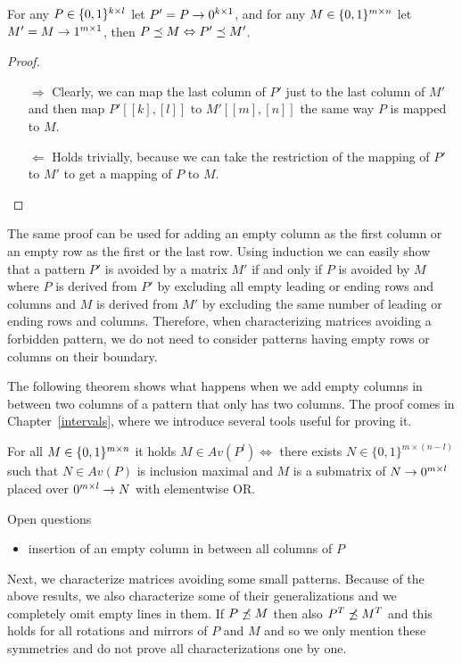 \begin{obs}
\label{obs:emptyrows}
For any $P\in\{0,1\}^{k\times l}$ let $P'=P\rightarrow 0^{k\times1}$, and for any $M\in\{0,1\}^{m\times n}$ let $M'=M\rightarrow 1^{m\times1}$, then $P\preceq M\Leftrightarrow P'\preceq M'$.
\end{obs}
\begin{proof}
\begin{itemize}
	\item[$\Rightarrow$] Clearly, we can map the last column of $P'$ just to the last column of $M'$ and then map $P'[[k],[l]]$ to $M'[[m],[n]]$ the same way $P$ is mapped to $M$.
	\item[$\Leftarrow$] Holds trivially, because we can take the restriction of the mapping of $P'$ to $M'$ to get a mapping of $P$ to $M$.
\end{itemize}
\end{proof}

The same proof can be used for adding an empty column as the first column or an empty row as the first or the last row. Using induction we can easily show that a pattern $P'$ is avoided by a matrix $M'$ if and only if $P$ is avoided by $M$ where $P$ is derived from $P'$ by excluding all empty leading or ending rows and columns and $M$ is derived from $M'$ by excluding the same number of leading or ending rows and columns. Therefore, when characterizing matrices avoiding a forbidden pattern, we do not need to consider patterns having empty rows or columns on their boundary.

The following theorem shows what happens when we add empty columns in between two columns of a pattern that only has two columns. The proof comes in Chapter~\ref{intervals}, where we introduce several tools useful for proving it.

\begin{thm}
\label{thm:emptymiddle}
For all $M\in\{0,1\}^{m\times n}$ it holds $M\in Av(P^l)\Leftrightarrow$ there exists $N\in\{0,1\}^{m\times(n-l)}$ such that $N\in Av(P)$ is inclusion maximal and $M$ is a submatrix of $N\rightarrow 0^{m\times l}$ placed over $0^{m\times l}\rightarrow N$ with elementwise OR.
\end{thm}

Open questions
\begin{itemize}
	\item insertion of an empty column in between all columns of $P$
\end{itemize}

Next, we characterize matrices avoiding some small patterns. Because of the above results, we also characterize some of their generalizations and we completely omit empty lines in them. If $P\not\preceq M$ then also $P^T\not\preceq M^T$ and this holds for all rotations and mirrors of $P$ and $M$ and so we only mention these symmetries and do not prove all characterizations one by one.

